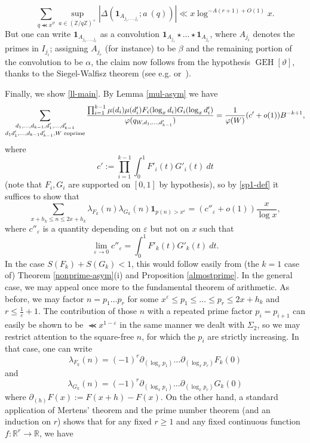 \documentclass{bmcart}
\DeclareMathOperator*\GEH{GEH}
\theoremstyle{plain}
\theoremstyle{definition}
\newcommand\R{\mathbb{R}}
\newcommand\Z{\mathbb{Z}}
\newcommand\eps{\varepsilon}
\renewcommand{\lessapprox}{\llcurly}
\renewcommand{\phi}{\varphi}
\newcommand{\onef}{\mathbf{1}}
\begin{document}
$$
\sum_{q \lessapprox x^\vartheta} \sup_{a \in (\Z/q\Z)^\times} |\Delta( \onef_{A_{j_1,\dots,j_r}};  a\ (q))| \ll x \log^{-A(r+1)+O(1)} x.
$$
But one can write $\onef_{A_{j_1,\dots,j_r}}$ as a convolution $\onef_{A_{j_1}} \star \dots \star \onef_{A_{j_r}}$, where $A_{j_i}$ denotes the primes in $I_{j_i}$; assigning $A_{j_r}$ (for instance) to be $\beta$ and the remaining portion of the convolution to be $\alpha$, the claim now follows from the hypothesis $\GEH[\vartheta]$, thanks to the Siegel-Walfisz theorem (see e.g. \cite[Satz 4]{siebert} or~\cite[Th. 5.29]{ik}).

Finally, we show \eqref{ll-main}.  By Lemma \ref{mul-asym} we have
$$
 \sum_{\substack{ d_1,\dots,d_{k-1},d'_1,\dots,d'_{k-1}\\ d_1d'_1,\dots,d_{k-1}d'_{k-1}, W \text{ coprime}}} \hspace{0pt minus 1fil}\frac{\prod_{i=1}^{k-1} \mu(d_{i}) \mu(d'_{i}) F_{i}(\log_x d_{i}) G_{i}(\log_x d'_{i}) }{\phi(q_{W,d_1,\dots,d'_{k-1}})} = \frac{1}{\phi(W)} (c'+o(1)) B^{-k+1},$$
where
$$ c' := \prod_{i=1}^{k-1} \int_0^1 F'_i(t) G'_i(t)\ dt$$
(note that $F_i, G_i$ are supported on $[0,1]$ by hypothesis), so by \eqref{sp1-def} it suffices to show that
\begin{equation}\label{cpeps}
\sum_{x+h_k \leq n \leq 2x+h_k} \lambda_{F_k}(n) \lambda_{G_k}(n) \onef_{p(n)>x^\eps} = (c''_\eps + o(1)) \frac{x}{\log x},
\end{equation}
where $c''_{\eps}$ is a quantity depending on $\eps$ but not on $x$ such that
$$ \lim_{\eps \to 0} c''_{\eps} = \int_0^1 F'_k(t) G'_k(t)\ dt.$$
In the case $S(F_k)+S(G_k) < 1$, this would follow easily from (the $k=1$ case of) Theorem \ref{nonprime-asym}(i) and Proposition \ref{almostprime}.  In the general case, we may appeal once more to the fundamental theorem of arithmetic.  As before, we may factor $n = p_1 \dots p_r$ for some $x^\eps \leq p_1 \leq \dots \leq p_r \leq 2x+h_k$ and $r \leq \frac{1}{\eps}+1$.  The contribution of those $n$ with a repeated prime factor $p_i = p_{i+1}$ can easily be shown to be $\lessapprox x^{1-\eps}$ in the same manner we dealt with $\Sigma_2$, so we may restrict attention to the square-free $n$, for which the $p_i$ are strictly increasing.  In that case, one can write
$$ \lambda_{F_k}(n) = (-1)^r \partial_{(\log_x p_1)} \dots \partial_{(\log_x p_r)} F_k(0)$$
and
$$ \lambda_{G_k}(n) = (-1)^r \partial_{(\log_x p_1)} \dots \partial_{(\log_x p_r)} G_k(0)$$
where $\partial_{(h)} F(x) := F(x+h)-F(x)$.  On the other hand, a standard application of Mertens' theorem and the prime number theorem (and an induction on $r$) shows that for any fixed $r \geq 1$ and any fixed continuous function $f: \R^r \to \R$, we have
\end{document}
